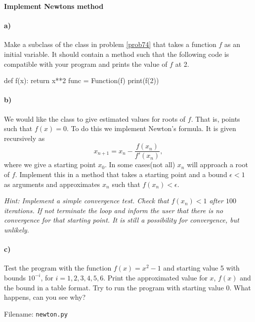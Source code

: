 
\begin{Problem}{\textbf{Implement Newtons method}} \label{prob91}

\paragraph{a)}
Make a subclass  of the class  in problem \ref{prob74}
that takes a function $f$ as
an initial variable. It should contain a method such that the following code
is compatible with your program and prints the value of $f$ at 2.
\begin{python}
def f(x):
    return x**2
func = Function(f)
print(f(2))
\end{python}

\paragraph{b)}
We would like the class to give estimated values for roots of $f$. That is,
points such that $f(x)=0$. To do this we implement Newton's formula. It is given
recursively as
\begin{equation*}
    x_{n+1}=x_n-\frac{f(x_n)}{f'(x_n)},
\end{equation*}
where we give a starting point $x_0$. In some cases(not all) $x_n$ will approach
a root of $f$. Implement this in a method  that takes a
starting point and a bound $\epsilon<1$ as arguments and approximates $x_n$ such that
$f(x_n)<\epsilon$.

\emph{Hint: Implement a simple convergence test. Check that $f(x_n)<1$ after $100$ iterations. If
not terminate the loop and inform the user that there is no convergence for that
starting point. It is still a possibility for convergence, but unlikely.}

\paragraph{c)}
Test the program with the function $f(x)=x^2-1$ and starting value 5 with bounds
$10^{-i}$, for $i=1,2,3,4,5,6$. Print the approximated value for $x$, $f(x)$ and the
bound in a table format. Try to run the program with starting value 0. What happens,
can you see why?

Filename: \texttt{newton.py}
\end{Problem} 


